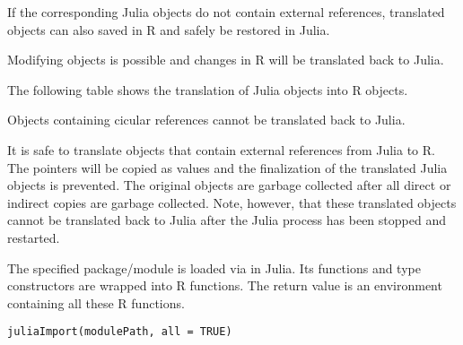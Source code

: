 \begin{Details}\relax
If the corresponding Julia objects do not contain external references,
translated objects can also saved in R and safely be restored in Julia.

Modifying objects is possible and changes in R will be translated back to Julia.

The following table shows the translation of Julia objects into R objects.


\end{Details}
%
\begin{Note}\relax
Objects containing cicular references cannot be translated back to Julia.

It is safe to translate objects that contain external references from Julia to R.
The pointers will be copied as values and the finalization of the translated
Julia objects is prevented.
The original objects are garbage collected after all direct or
indirect copies are garbage collected.
Note, however, that these translated objects cannot be translated back to Julia
after the Julia process has been stopped and restarted.
\end{Note}
%
\begin{Description}\relax
The specified package/module is loaded via  in Julia.
Its functions and type constructors are wrapped into R functions.
The return value is an environment containing all these R functions.
\end{Description}
%
\begin{Usage}
\begin{verbatim}
juliaImport(modulePath, all = TRUE)
\end{verbatim}
\end{Usage}
